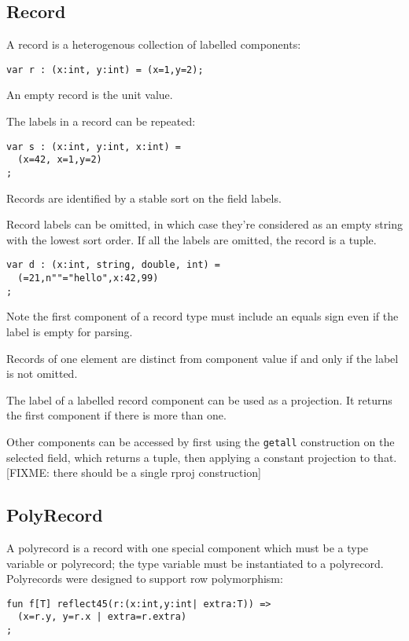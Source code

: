 \documentclass[oneside]{book}
\begin{document}
\subsection{Record}
A record is a heterogenous collection of labelled components:
\begin{verbatim}
var r : (x:int, y:int) = (x=1,y=2);
\end{verbatim}
An empty record is the unit value. 

The labels in a record can be repeated:
\begin{verbatim}
var s : (x:int, y:int, x:int) = 
  (x=42, x=1,y=2)
;
\end{verbatim}
Records are identified by a stable sort on the field labels.

Record labels can be omitted, in which case they're considered
as an empty string with the lowest sort order. 
If all the labels are omitted, the record is a tuple.

\begin{verbatim}
var d : (x:int, string, double, int) = 
  (=21,n""="hello",x:42,99)
;
\end{verbatim}

Note the first component of a record type must include
an equals sign even if the label is empty for parsing.

Records of one element are distinct from component value if
and only if the label is not omitted.

The label of a labelled record component can be used as a projection.
It returns the first component if there is more than one.

Other components can be accessed by first using the \verb$getall$ construction
on the selected field, which returns a tuple, then applying a constant
projection to that. [FIXME: there should be a single rproj construction]


\subsection{PolyRecord}
A polyrecord is a record with one special component which must be
a type variable or polyrecord; the type variable must be instantiated
to a polyrecord. Polyrecords were designed to support row polymorphism:

\begin{verbatim}
fun f[T] reflect45(r:(x:int,y:int| extra:T)) =>
  (x=r.y, y=r.x | extra=r.extra)
; 
\end{verbatim}
\end{document}
